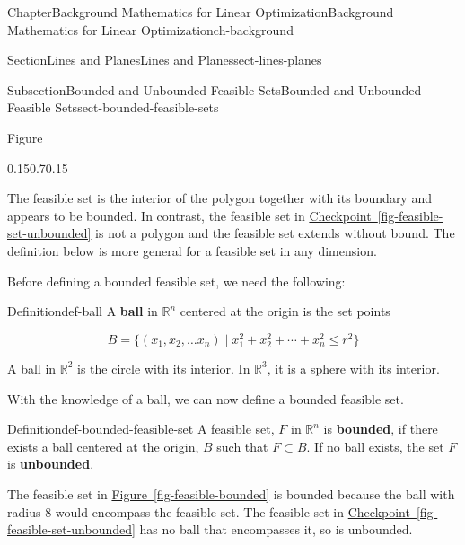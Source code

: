 \documentclass[oneside,10pt,]{book}
\newcommand{\xreffont}{\relax}
\newcommand{\terminology}[1]{\textbf{#1}}
\numberwithin{equation}{section}
\begin{document}
\begin{chapterptx}{Chapter}{Background Mathematics for Linear Optimization}{}{Background Mathematics for Linear Optimization}{}{}{ch-background}
\begin{sectionptx}{Section}{Lines and Planes}{}{Lines and Planes}{}{}{sect-lines-planes}
\begin{subsectionptx}{Subsection}{Bounded and Unbounded Feasible Sets}{}{Bounded and Unbounded Feasible Sets}{}{}{sect-bounded-feasible-sets}
\begin{figureptx}{Figure}
\begin{image}{0.15}{0.7}{0.15}{}
{%
}%
\end{image}%
\tcblower
\end{figureptx}%
The feasible set is the interior of the polygon together with its boundary and appears to be bounded. In contrast, the feasible set in \hyperref[fig-feasible-set-unbounded]{Checkpoint~{\xreffont\ref{fig-feasible-set-unbounded}}} is not a polygon and the feasible set extends without bound. The definition below is more general for a feasible set in any dimension.%
\par
Before defining a bounded feasible set, we need the following:%
\begin{definition}{Definition}{}{def-ball}%
A \terminology{ball} in \(\mathbb{R}^n\) centered at the origin is the set points%
\par
%
\begin{equation*}
B = \{ (x_1, x_2, \ldots x_n) \; | \; x_1^2 + x_2^2 + \cdots + x_n^2 \leq r^2 \}
\end{equation*}
%
\end{definition}
A ball in \(\mathbb{R}^2\) is the circle with its interior. In \(\mathbb{R}^3\), it is a sphere with its interior.%
\par
With the knowledge of a ball, we can now define a bounded feasible set.%
\begin{definition}{Definition}{}{def-bounded-feasible-set}%
A feasible set, \(F\) in \(\mathbb{R}^n\) is \terminology{bounded}, if there exists a ball centered at the origin, \(B\) such that \(F \subset B\). If no ball exists, the set \(F\) is \terminology{unbounded}.%
\end{definition}
The feasible set in \hyperref[fig-feasible-bounded]{Figure~{\xreffont\ref{fig-feasible-bounded}}} is bounded because the ball with radius 8 would encompass the feasible set. The feasible set in \hyperref[fig-feasible-set-unbounded]{Checkpoint~{\xreffont\ref{fig-feasible-set-unbounded}}} has no ball that encompasses it, so is unbounded.%

\end{subsectionptx}
\end{sectionptx}
\end{chapterptx}
\end{document}
